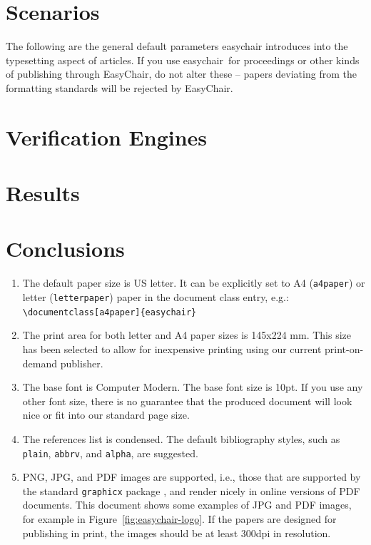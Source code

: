 \documentclass{easychair}
\newcommand{\easychair}{\textsf{easychair}}
\begin{document}
\section{Scenarios}
\label{sect:scenarios}

The following are the general default parameters {\easychair}
introduces into the typesetting aspect of articles. If you use
\easychair\ for proceedings or other kinds of publishing through
EasyChair, do not alter these -- papers deviating from the formatting
standards will be rejected by EasyChair.
\section{Verification Engines}

\section{Results}

\section{Conclusions}

\begin{enumerate}
\item
The default paper size is US letter. It can be explicitly set to A4 
(\texttt{a4paper}) or letter (\texttt{letterpaper}) paper in the
document class entry, e.g.:\\\verb+\documentclass[a4paper]{easychair}+

\item
The print area for both letter and A4 paper sizes is 145x224 mm. This size
has been selected to allow for inexpensive printing using our current
print-on-demand publisher.

\item
The base font is Computer Modern. The base font size is 10pt. If you
use any other font size, there is no guarantee that the produced
document will look nice or fit into our standard page size.

\item
The references list is condensed. The default bibliography styles, such as
\texttt{plain}, \texttt{abbrv}, and \texttt{alpha}, are suggested.

\item
PNG, JPG, and PDF images are supported, i.e., those that are supported
by the standard \texttt{graphicx} package \cite{graphicx-package}, and
render nicely in online versions of PDF documents.  This document
shows some examples of JPG and PDF images, for example in
Figure~\ref{fig:easychair-logo}. If the papers are designed for
publishing in print, the images should be at least 300dpi in
resolution. 

\end{enumerate}
\end{document}
